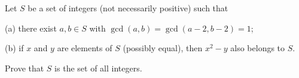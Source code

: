 Let $S$ be a set of integers (not necessarily positive) such that

(a) there exist $a,b \in S$ with $\gcd(a,b)=\gcd(a-2,b-2)=1$;

(b) if $x$ and $y$ are elements of $S$ (possibly equal), then $x^2-y$ also belongs to $S$.

Prove that $S$ is the set of all integers.
